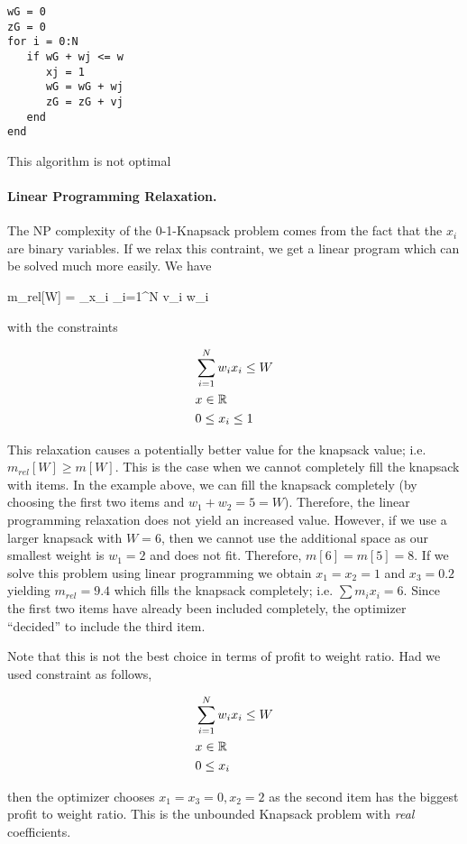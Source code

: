 \begin{verbatim}
wG = 0
zG = 0
for i = 0:N
   if wG + wj <= w
      xj = 1
      wG = wG + wj
      zG = zG + vj
   end
end
\end{verbatim}

This algorithm is not optimal 

\paragraph{Linear Programming Relaxation.} The NP complexity of the 0-1-Knapsack problem comes from the fact that the $x_i$ are binary variables. If we relax this contraint, we get a linear program which can be solved much more easily. We have

\bee
m_{rel}[W] = \max_{x_i} \sum_{i=1}^N v_i w_i
\eee

with the constraints

\begin{align*}
  & \sum_{i=1}^N w_i x_i \leq W \\
  & x \in \mathbb{R} \\
  & 0 \leq x_i \leq 1
\end{align*}

This relaxation causes a potentially better value for the knapsack value; i.e. $m_{rel}[W] \geq m[W]$. This is the case when we cannot completely fill the knapsack with items. In the example above, we can fill the knapsack completely (by choosing the first two items and $w_1 + w_2 = 5 = W$). Therefore, the linear programming relaxation does not yield an increased value. However, if we use a larger knapsack with $W = 6$, then we cannot use the additional space as our smallest weight is $w_1 = 2$ and does not fit. Therefore, $m[6] = m[5] = 8$. If we solve this problem using linear programming we obtain $x_1 = x_2 = 1$ and $x_3 = 0.2$ yielding $m_{rel} = 9.4$ which fills the knapsack completely; i.e. $\sum m_i x_i = 6$. Since the first two items have already been included completely, the optimizer ``decided'' to include the third item.

Note that this is not the best choice in terms of profit to weight ratio. Had we used constraint as follows,

\begin{align*}
  & \sum_{i=1}^N w_i x_i \leq W \\
  & x \in \mathbb{R} \\
  & 0 \leq x_i
\end{align*}

then the optimizer chooses $x_1 = x_3 = 0, x_2 = 2$ as the second item has the biggest profit to weight ratio. This is the unbounded Knapsack problem with \emph{real} coefficients.



